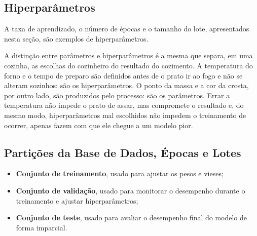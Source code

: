 \subsection{Hiperparâmetros}
 A taxa de aprendizado, o número de épocas e o tamanho do lote, apresentados nesta seção, são exemplos de hiperparâmetros.

A distinção entre parâmetros e hiperparâmetros é a mesma que separa, em uma cozinha, as
escolhas do cozinheiro do resultado do cozimento. A temperatura do forno e o tempo de
preparo são definidos antes de o prato ir ao fogo e não se alteram sozinhos: são os
hiperparâmetros. O ponto da massa e a cor da crosta, por outro lado, são produzidos pelo
processo: são os parâmetros. Errar a temperatura não impede o prato de assar, mas
compromete o resultado e, do mesmo modo, hiperparâmetros mal escolhidos não impedem o
treinamento de ocorrer, apenas fazem com que ele chegue a um modelo pior.

\subsection{Partições da Base de Dados, Épocas e Lotes}
\begin{itemize}
    \item \textbf{Conjunto de treinamento}, usado para ajustar os pesos e vieses;
    \item \textbf{Conjunto de validação}, usado para monitorar o desempenho durante o treinamento e ajustar hiperparâmetros;
    \item \textbf{Conjunto de teste}, usado para avaliar o desempenho final do modelo de forma imparcial.
\end{itemize}

